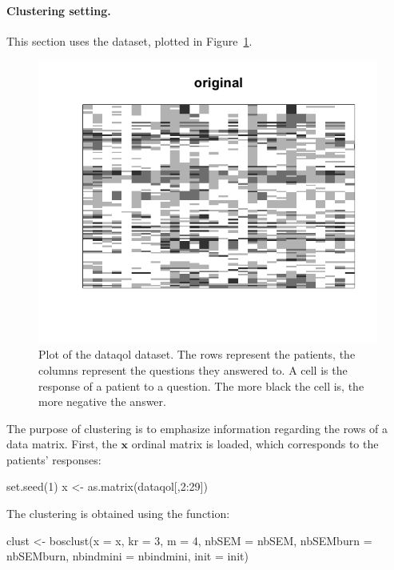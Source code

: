 \paragraph{Clustering setting.} This section uses the  dataset, plotted in Figure~\ref{fig:original}. 

\begin{figure}
    \centering
    \includegraphics[width = .8\textwidth]{images/original.png}
    \caption{Plot of the dataqol dataset. The rows represent the patients, the columns represent the questions they answered to. A cell is the response of a patient to a question. The more black the cell is, the more negative the answer.}
    \label{fig:original}
\end{figure}

The purpose of clustering is to emphasize information regarding the rows of a data matrix. First, the $\boldsymbol{x}$ ordinal matrix is loaded, which corresponds to the patients' responses:
\begin{example}
set.seed(1)
x <- as.matrix(dataqol[,2:29])
\end{example}
The clustering is obtained using the  function:
\begin{example}
clust <- bosclust(x = x, kr = 3, m = 4, 
            nbSEM = nbSEM, nbSEMburn = nbSEMburn, 
            nbindmini = nbindmini, init = init)
\end{example}

